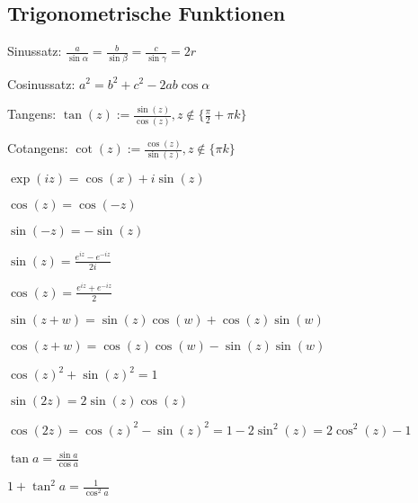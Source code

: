 \subsection{Trigonometrische Funktionen}
\begin{compactdesc}
    \item[Sinussatz:] $\frac{a}{\sin \alpha} = \frac{b}{\sin \beta} = \frac{c}{\sin \gamma} = 2r$
    \item[Cosinussatz:] $a^2 = b^2 + c^2 - 2ab \cos \alpha$
    \item[Tangens:] $\tan(z) := \frac{\sin(z)}{\cos(z)}, z \not\in \{\frac{\pi}{2} + \pi k\}$
    \item[Cotangens:] $\cot(z) := \frac{\cos(z)}{\sin(z)}, z \not\in \{\pi k\}$
\end{compactdesc}
\begin{compactitem}
    \item $\exp(iz) = \cos(x) + i \sin(z)$
    \item
        \begin{inparaitem}
            \item $\cos(z) = \cos(-z)$
            \item $\sin(-z) = - \sin(z)$
        \end{inparaitem}
    \item
        \begin{inparaitem}
            \item $\sin(z) = \frac{e^{iz} - e^{-iz}}{2i}$
            \item $\cos(z) = \frac{e^{iz} + e^{-iz}}{2}$
        \end{inparaitem}
    \item
        \begin{inparaitem}
            \item $\sin(z + w) = \sin(z) \cos(w) + \cos(z) \sin(w)$
            \item $\cos(z + w) = \cos(z) \cos(w) - \sin(z) \sin(w)$
        \end{inparaitem}
    \item $\cos(z)^2 + \sin(z)^2 = 1$
    \item
        \begin{compactitem}
            \item $\sin(2z) = 2 \sin(z) \cos(z)$
            \item $\cos(2z) = \cos(z)^2 - \sin(z)^2 = 1 - 2 \sin^2(z) = 2 \cos^2(z) - 1$
        \end{compactitem}
    \item $\tan a = \frac{\sin a}{\cos a}$
    \item $1 + \tan^2 a = \frac{1}{\cos^2 a}$
\end{compactitem}

